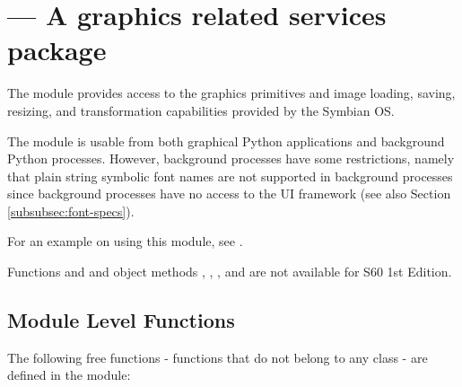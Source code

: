 %
%
%

\newcommand{\notinfirsted}{
\begin{notice}
Not supported in S60 1st Edition!
\end{notice}

}

\section{ ---
  A graphics related services package}
\label{sec:graphics}


The  module provides access to the graphics primitives and 
image loading, saving, resizing, and transformation capabilities provided by 
the Symbian OS. 

The module is usable from both graphical Python applications and
background Python processes. However, background processes have some
restrictions, namely that plain string symbolic font names are not
supported in background processes since background processes have no
access to the UI framework (see also Section
\ref{subsubsec:font-specs}).

For an example on using this module, see \cite{PyS60Prog}.

Functions  and  and  
object methods , , , and 
 are not available for S60 1st Edition.

\subsection{Module Level Functions}
\label{subsec:mylabel7}
The following free functions - functions that do not belong to any class 
- are defined in the  module:

